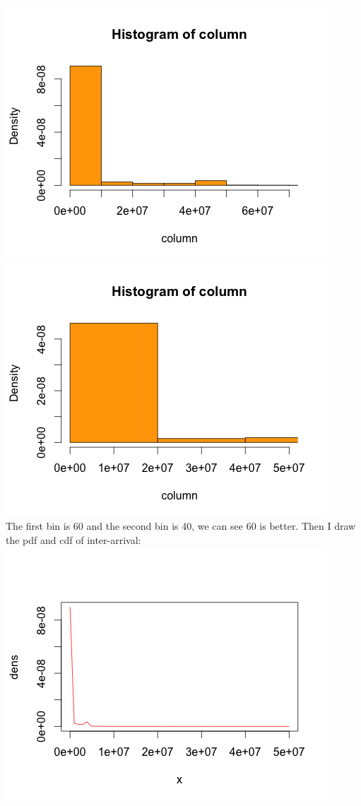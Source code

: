 \documentclass[11pt]{article}
\begin{document}
\includegraphics[scale=0.5]{Rplot_2.png}
\includegraphics[scale=0.5]{Rplot_50000000.png} \\
The first bin is 60 and the second bin is 40, we can see 60 is better. Then I draw the pdf and cdf of inter-arrival: \\
\includegraphics[scale=0.5]{1_pdf_inter_arrival.png}
\end{document}
